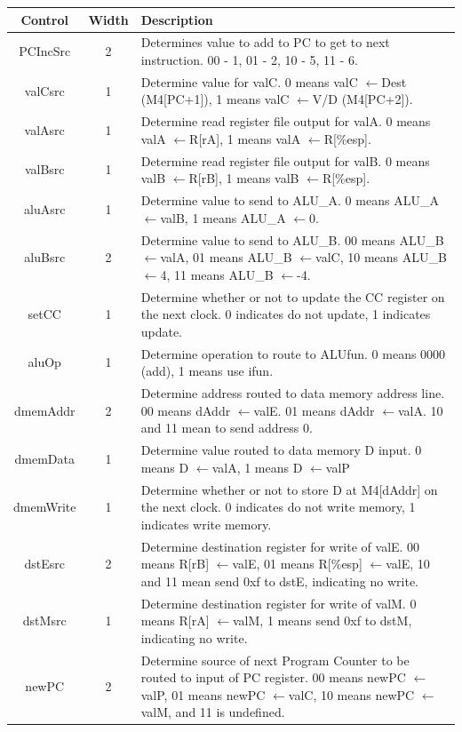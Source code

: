 \documentclass[11pt]{article}
\newcommand{\set}{$\leftarrow$}
\begin{document}
\begin{center}
\begin{longtable}{|c|c|p{4.5in}|}
\hline
\bf{Control} & \bf{Width} & \bf{Description} \\ \hline \hline
PCIncSrc & 2 & Determines value to add to PC to get to next instruction. \hspace{1in} 00 - 1, 01 - 2, 10 - 5, 11 - 6.\\ \hline
valCsrc & 1 & Determine value for valC. 0 means valC \set Dest (M4[PC+1]), 1 means valC \set V/D (M4[PC+2]). \\ \hline
valAsrc & 1 & Determine read register file output for valA. 0 means valA \set R[rA], 1 means valA \set R[\%esp].\\ \hline
valBsrc & 1 & Determine read register file output for valB. 0 means valB \set R[rB], 1 means valB \set R[\%esp]. \\ \hline
aluAsrc & 1 & Determine value to send to ALU\_A. 0 means ALU\_A \set valB, 1 means ALU\_A \set 0. \\ \hline
aluBsrc & 2 & Determine value to send to ALU\_B. 00 means ALU\_B \set valA, 01 means ALU\_B \set valC, 10 means ALU\_B \set 4, 11 means ALU\_B \set -4.\\ \hline
setCC & 1 & Determine whether or not to update the CC register on the next clock. 0 indicates do not update, 1 indicates update. \\ \hline
aluOp & 1 & Determine operation to route to ALUfun. 0 means 0000 (add), 1 means use ifun. \\ \hline
dmemAddr & 2 & Determine address routed to data memory address line. 00 means dAddr \set valE. 01 means dAddr \set valA. 10 and 11 mean to send address 0.\\ \hline
dmemData & 1 & Determine value routed to data memory D input. 0 means D \set valA, 1 means D \set valP \\ \hline
dmemWrite & 1 & Determine whether or not to store D at M4[dAddr] on the next clock. 0 indicates do not write memory, 1 indicates write memory. \\ \hline
dstEsrc & 2 & Determine destination register for write of valE. 00 means R[rB] \set valE, 01 means R[\%esp] \set valE, 10 and 11 mean send 0xf to dstE, indicating no write. \\ \hline
dstMsrc & 1 & Determine destination register for write of valM. 0 means R[rA] \set valM, 1 means send 0xf to dstM, indicating no write. \\ \hline
newPC & 2 & Determine source of next Program Counter to be routed to input of PC register. 00 means newPC \set valP, 01 means newPC \set valC, 10 means newPC \set valM, and 11 is undefined. \\ \hline
\end{longtable}
\end{center}
\end{document}
